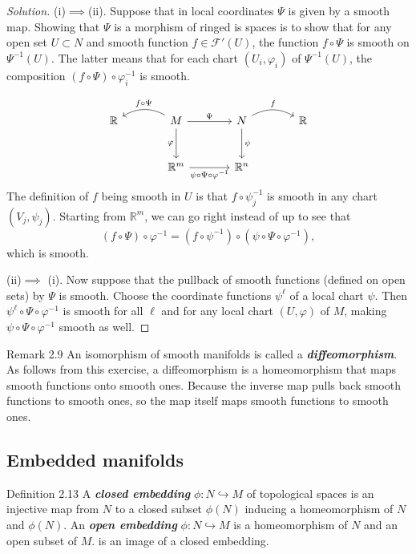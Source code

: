 \begin{proof}[Solution]\leavevmode
(i)$\implies $(ii). Suppose that in local coordinates $\Psi$ is given by a smooth map. Showing that $\Psi$ is a morphism of ringed is spaces is to show that for any open set $U \subset N$ and smooth function $f \in\mathcal{F}'(U)$, the function $f \circ \Psi$ is smooth on $\Psi^{-1}(U)$. The latter means that for each chart $(U_i,\varphi_i)$ of $\Psi^{-1}(U)$, the composition  $(f \circ\Psi)\circ \varphi_i^{-1}$ is smooth.

\[\begin{tikzcd}[column sep=large,row sep=large]
	\mathbb{R}&M\arrow[r,"\Psi"]\arrow[d,swap,"\varphi"]\arrow[l,swap,"f \circ \Psi",bend right]& N\arrow[d,"\psi"]\arrow[r,"f",bend left]&\mathbb{R}\\
	&\mathbb{R}^m\arrow[r,"\psi\circ\Psi\circ \varphi^{-1}",swap]&\mathbb{R}^n
\end{tikzcd}\]
The definition of $f$ being smooth in $U$ is that  $f \circ \psi^{-1}_j$ is smooth in any chart $(V_j,\psi_j)$. Starting from $\mathbb{R}^m$, we can go right instead of up to see that
\[(f \circ \Psi)\circ \varphi^{-1}=(f \circ \psi^{-1}) \circ (\psi \circ \Psi \circ\varphi^{-1}),\]
which is smooth.

(ii)$\implies $ (i). Now suppose that the pullback of smooth functions (defined on open sets) by $\Psi$ is smooth. Choose the coordinate functions $\psi^\ell$ of a local chart $\psi$. Then $\psi^\ell \circ \Psi \circ \varphi^{-1}$ is smooth for all $\ell$ and for any local chart $(U,\varphi)$ of $M$, making $\psi \circ \Psi \circ \varphi^{-1}$ smooth as well.
\end{proof}

\begin{thing5}{Remark 2.9}\label{rk:2.9}\leavevmode
An isomorphism of smooth manifolds is called a \textit{\textbf{diffeomorphism}}. As follows from this exercise, a diffeomorphism is a homeomorphism that maps smooth functions onto smooth ones. {\color{14}Because the inverse map pulls back smooth functions to smooth ones, so the map itself maps smooth functions to smooth ones.}
\end{thing5}

\subsection{Embedded manifolds}

\begin{thing3}{Definition 2.13}\leavevmode
A \textit{\textbf{closed embedding}} $\phi:N \hookrightarrow M$ of topological spaces is an injective map from $N$ to a closed subset $\phi(N)$ inducing a homeomorphism of $N$ and $\phi(N)$. An \textit{\textbf{open embedding}} $\phi:N \hookrightarrow M$ is a homeomorphism of $N$ and an open subset of $M$. is an image of a closed embedding.
\end{thing3}

